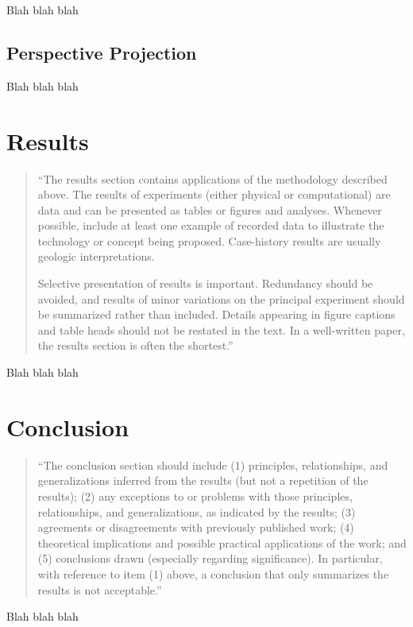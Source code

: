 \documentclass[]{report}   %
\begin{document}
Blah blah blah


\section{Perspective Projection}

Blah blah blah





\chapter{Results}           %

\begin{quotation}
	``The results section contains applications of the methodology described above. The results of experiments
	(either physical or computational) are data and can be presented as tables or figures and analyses. Whenever
	possible, include at least one example of recorded data to illustrate the technology or concept being proposed.
	Case-history results are usually geologic interpretations.

	Selective presentation of results is important. Redundancy should be avoided, and results of minor variations on
	the principal experiment should be summarized rather than included. Details appearing in figure captions and
	table heads should not be restated in the text. In a well-written paper, the results section is often the
	shortest.''
\end{quotation}


Blah blah blah





\chapter{Conclusion}		%

\begin{quotation}
	``The conclusion section should include (1) principles, relationships, and generalizations inferred from the
	results (but not a repetition of the results); (2) any exceptions to or problems with those principles,
	relationships, and generalizations, as indicated by the results; (3) agreements or disagreements with previously
	published work; (4) theoretical implications and possible practical applications of the work; and (5) conclusions
	drawn (especially regarding significance). In particular, with reference to item (1) above, a conclusion that
	only summarizes the results is not acceptable.''
\end{quotation}


Blah blah blah






\begin{thebibliography}{9}
\end{thebibliography}
\end{document}
